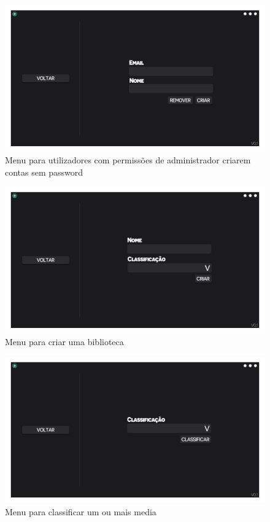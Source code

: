 \documentclass[a4paper]{report}
\begin{document}
\begin{figure}[H]
	\centering 
    \includegraphics[width=\textwidth]{images/CriarConta_Menu.png}  
    \caption{Menu para utilizadores com permissões de administrador criarem contas sem password}
\end{figure}

\begin{figure}[H]
	\centering 
    \includegraphics[width=\textwidth]{images/Criar_Biblioteca_Menu.png}  
    \caption{Menu para criar uma biblioteca}
\end{figure}

\begin{figure}[H]
	\centering 
    \includegraphics[width=\textwidth]{images/Classificar_Menu.png}  
    \caption{Menu para classificar um ou mais media}
\end{figure}
\end{document}
